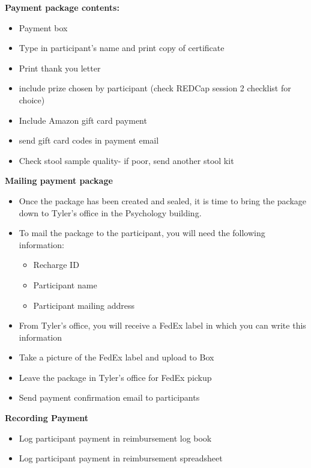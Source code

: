 \documentclass[]{book}
\begin{document}
\textbf{Payment package contents:}

\begin{itemize}
\item
  Payment box
\item
  Type in participant's name and print copy of certificate
\item
  Print thank you letter
\item
  include prize chosen by participant (check REDCap session 2 checklist for choice)
\item
  Include Amazon gift card payment
\item
  send gift card codes in payment email
\item
  Check stool sample quality- if poor, send another stool kit
\end{itemize}

\textbf{Mailing payment package}

\begin{itemize}
\item
  Once the package has been created and sealed, it is time to bring the package down to Tyler's office in the Psychology building.
\item
  To mail the package to the participant, you will need the following information:

  \begin{itemize}
  \item
    Recharge ID
  \item
    Participant name
  \item
    Participant mailing address
  \end{itemize}
\item
  From Tyler's office, you will receive a FedEx label in which you can write this information
\item
  Take a picture of the FedEx label and upload to Box
\item
  Leave the package in Tyler's office for FedEx pickup
\item
  Send payment confirmation email to participants
\end{itemize}

\textbf{Recording Payment}

\begin{itemize}
\item
  Log participant payment in reimbursement log book
\item
  Log participant payment in reimbursement spreadsheet
\end{itemize}
\end{document}
